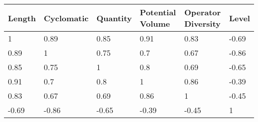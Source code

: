 \begin{tabular}{llllll}
Length & Cyclomatic & Quantity & Potential Volume & Operator Diversity & Level \\ 
\hline 
1 & 0.89 & 0.85 & 0.91 & 0.83 & -0.69 \\ 
0.89 & 1 & 0.75 & 0.7 & 0.67 & -0.86 \\ 
0.85 & 0.75 & 1 & 0.8 & 0.69 & -0.65 \\ 
0.91 & 0.7 & 0.8 & 1 & 0.86 & -0.39 \\ 
0.83 & 0.67 & 0.69 & 0.86 & 1 & -0.45 \\ 
-0.69 & -0.86 & -0.65 & -0.39 & -0.45 & 1 \\ 
\hline 
\end{tabular}